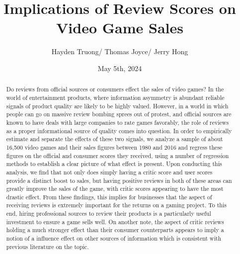 \documentclass[12pt,english]{article}
\begin{document}
\begin{singlespace}
\title{Implications of Review Scores on Video Game Sales}
\end{singlespace}

\author{Hayden Truong/ Thomas Joyce/ Jerry Hong}
\date{May 5th, 2024}


\maketitle

\begin{abstract}
\begin{singlespace}
Do reviews from official sources or consumers effect the sales of video games? In the world of 
entertainment products, where information asymmetry is abundant reliable signals of product 
quality are likely to be highly valued. However, in a world in which people can go on massive 
review bombing sprees out of protest, and official sources are known to have deals with large 
companies to rate games favorably, the role of reviews as a proper informational source of 
quality comes into question. In order to empirically estimate and separate the effects of these two 
signals, we analyze a sample of about 16,500 video games and their sales figures between 1980 
and 2016 and regress these figures on the official and consumer scores they received, using a 
number of regression methods to establish a clear picture of what effect is present. Upon 
conducting this analysis, we find that not only does simply having a critic score and user scores 
provide a distinct boost to sales, but having positive reviews in both of these areas can greatly 
improve the sales of the game, with critic scores appearing to have the most drastic effect. From 
these findings, this implies for businesses that the aspect of receiving reviews is extremely 
important for the returns on a gaming project. To this end, hiring professional sources to review 
their products is a particularly useful investment to ensure a game sells well. On another note, the 
aspect of critic reviews holding a much stronger effect than their consumer counterparts appears 
to imply a notion of a influence effect on other sources of information which is consistent with 
previous literature on the topic. 
\end{singlespace}

\end{abstract}
\vfill{}


\pagebreak{}
\tableofcontents
\pagebreak
\end{document}

